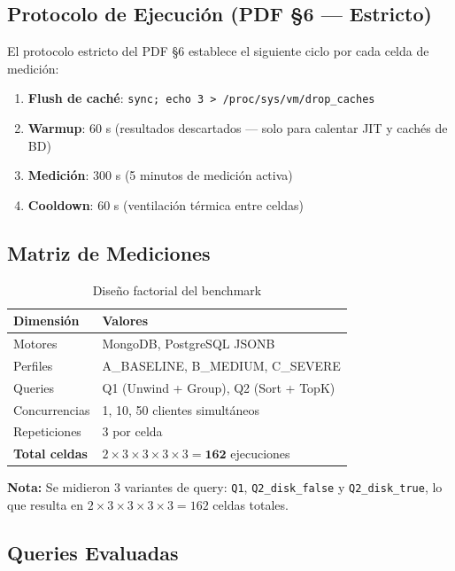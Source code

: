 \documentclass[12pt,a4paper]{article}
\begin{document}
\subsection{Protocolo de Ejecución (PDF §6 — Estricto)}

El protocolo estricto del PDF §6 establece el siguiente ciclo por cada celda de medición:

\begin{enumerate}
  \item \textbf{Flush de caché}: \texttt{sync; echo 3 > /proc/sys/vm/drop\_caches}
  \item \textbf{Warmup}: 60 s (resultados descartados — solo para calentar JIT y cachés de BD)
  \item \textbf{Medición}: 300 s (5 minutos de medición activa)
  \item \textbf{Cooldown}: 60 s (ventilación térmica entre celdas)
\end{enumerate}

\subsection{Matriz de Mediciones}

\begin{table}[H]
\centering
\caption{Diseño factorial del benchmark}
\begin{tabular}{ll}
\toprule
\textbf{Dimensión}    & \textbf{Valores} \\
\midrule
Motores              & MongoDB, PostgreSQL JSONB \\
Perfiles             & A\_BASELINE, B\_MEDIUM, C\_SEVERE \\
Queries              & Q1 (Unwind + Group), Q2 (Sort + TopK) \\
Concurrencias        & 1, 10, 50 clientes simultáneos \\
Repeticiones         & 3 por celda \\
\midrule
\textbf{Total celdas} & $2 \times 3 \times 3 \times 3 \times 3 = \mathbf{162}$ ejecuciones \\
\bottomrule
\end{tabular}
\end{table}

\noindent\textbf{Nota:} Se midieron 3 variantes de query: \texttt{Q1}, \texttt{Q2\_disk\_false} y \texttt{Q2\_disk\_true}, lo que resulta en $2 \times 3 \times 3 \times 3 \times 3 = 162$ celdas totales.

\subsection{Queries Evaluadas}
\end{document}
